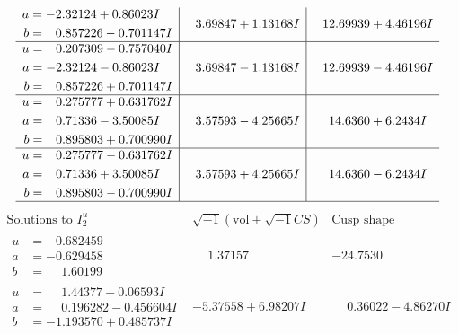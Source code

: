 \documentclass[1p]{elsarticle_modified}
\theoremstyle{definition}
\newcommand{\I}{\sqrt{-1}}
\begin{document}
$$\begin{array}{c|c|c}
\begin{aligned}
a &= -2.32124 + 0.86023 I \\
b &= \phantom{-}0.857226 - 0.701147 I\end{aligned}
 & \phantom{-}3.69847 + 1.13168 I & \phantom{-}12.69939 + 4.46196 I \\ \hline\begin{aligned}
u &= \phantom{-}0.207309 - 0.757040 I \\
a &= -2.32124 - 0.86023 I \\
b &= \phantom{-}0.857226 + 0.701147 I\end{aligned}
 & \phantom{-}3.69847 - 1.13168 I & \phantom{-}12.69939 - 4.46196 I \\ \hline\begin{aligned}
u &= \phantom{-}0.275777 + 0.631762 I \\
a &= \phantom{-}0.71336 - 3.50085 I \\
b &= \phantom{-}0.895803 + 0.700990 I\end{aligned}
 & \phantom{-}3.57593 - 4.25665 I & \phantom{-}14.6360 + 6.2434 I \\ \hline\begin{aligned}
u &= \phantom{-}0.275777 - 0.631762 I \\
a &= \phantom{-}0.71336 + 3.50085 I \\
b &= \phantom{-}0.895803 - 0.700990 I\end{aligned}
 & \phantom{-}3.57593 + 4.25665 I & \phantom{-}14.6360 - 6.2434 I\\
 \hline 
 \end{array}$$\newpage$$\begin{array}{c|c|c}  
\text{Solutions to }I^u_{2}& \I (\text{vol} + \sqrt{-1}CS) & \text{Cusp shape}\\
 \hline 
\begin{aligned}
u &= -0.682459\phantom{ +0.000000I} \\
a &= -0.629458\phantom{ +0.000000I} \\
b &= \phantom{-}1.60199\phantom{ +0.000000I}\end{aligned}
 & \phantom{-}1.37157\phantom{ +0.000000I} & -24.7530\phantom{ +0.000000I} \\ \hline\begin{aligned}
u &= \phantom{-}1.44377 + 0.06593 I \\
a &= \phantom{-}0.196282 - 0.456604 I \\
b &= -1.193570 + 0.485737 I\end{aligned}
 & -5.37558 + 6.98207 I & \phantom{-}0.36022 - 4.86270 I \\ \hline\begin{aligned}

\end{aligned}
\end{array}$$
\end{document}
